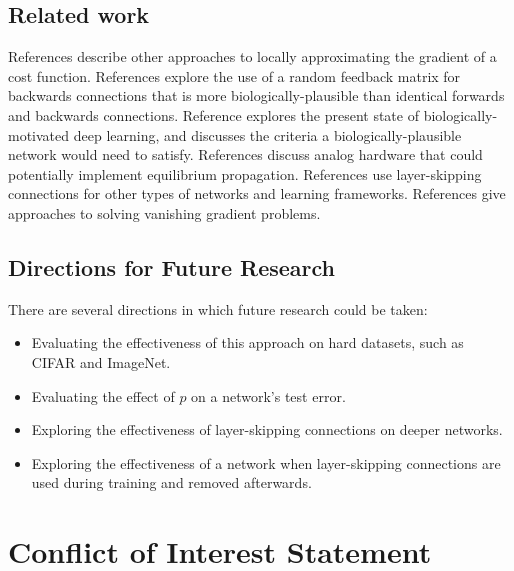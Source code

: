 \documentclass[utf8]{frontiersSCNS}
\begin{document}
\subsection{Related work}

References \citep{lee2015, xie2003, pineda1987} describe other approaches to locally approximating the gradient of a cost function. References \citep{lillicrap2014, crafton2019} explore the use of a random feedback matrix for backwards connections that is more biologically-plausible than identical forwards and backwards connections. Reference \citep{bartunov2018} explores the present state of biologically-motivated deep learning, and \citep{bengio2015} discusses the criteria a biologically-plausible network would need to satisfy. References \citep{shainline2019, davies2018, nahmias2013} discuss analog hardware that could potentially implement equilibrium propagation. References \citep{he2015, srivastava2015, xiaohu2011, krishnan2019} use layer-skipping connections for other types of networks and learning frameworks. References \citep{ioffe2015, glorot2010} give approaches to solving vanishing gradient problems.

\subsection{Directions for Future Research}

There are several directions in which future research could be taken:
\begin{itemize} 
\item Evaluating the effectiveness of this approach on hard datasets, such as CIFAR and ImageNet.
\item Evaluating the effect of $p$ on a network's test error.
\item Exploring the effectiveness of layer-skipping connections on deeper networks.
\item Exploring the effectiveness of a network when layer-skipping connections are used during training and removed afterwards.
\end{itemize}

\section*{Conflict of Interest Statement}
\end{document}
